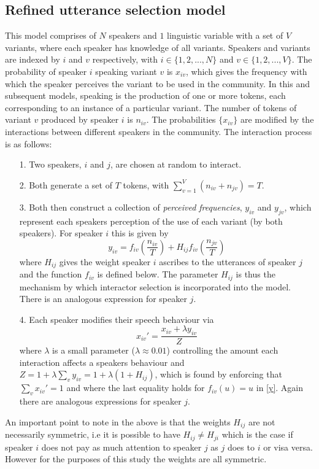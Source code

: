 \documentclass[12pt]{article}
\begin{document}
\subsection{Refined utterance selection model}
This model comprises of $N$ speakers and $1$ linguistic variable with a set of $V$ variants, where each speaker has knowledge of all variants. Speakers and variants are indexed by $i$ and $v$ respectively, with $i \in \{1, 2, ... , N\}$ and $v \in \{1, 2, ..., V\}$. The probability of speaker $i$ speaking variant $v$ is $x_{iv}$, which gives the frequency with which the speaker perceives the variant to be used in the community. In this and subsequent models, speaking is the production of one or more tokens, each corresponding to an instance of a particular variant. The number of tokens of variant $v$ produced by speaker $i$ is $n_{iv}$. The probabilities $\{x_{iv}\}$ are modified by the interactions between different speakers in the community. The interaction process is as follows: 
\begin{itemize}
\item[1.] Two speakers, $i$ and $j$, are chosen at random to interact.
\item[2.] Both generate a set of $T$ tokens, with $\sum\limits_{v = 1}^{V} (n_{iv} + n_{jv}) = T$. 
\item[3.] Both then construct a collection of \emph{perceived frequencies}, $y_{iv}$ and $y_{jv}$, which represent each speakers perception of the use of each variant (by both speakers). For speaker $i$ this is given by
\begin{equation} \label{y}
y_{iv} = f_{iv}(\frac{n_{iv}}{T}) + H_{ij}f_{iv}(\frac{n_{jv}}{T})
\end{equation}
where $H_{ij}$ gives the weight speaker $i$ ascribes to the utterances of speaker $j$ and the function $f_{iv}$ is defined below. The parameter $H_{ij}$ is thus the mechanism by which interactor selection is incorporated into the model. There is an analogous expression for speaker $j$. 
\item[4.] Each speaker modifies their speech behaviour via
\begin{equation}\label{x}
x_{iv}' = \frac{x_{iv} + \lambda y_{iv}}{Z}
\end{equation}
where $\lambda$ is a small parameter ($\lambda \approx 0.01$) controlling the amount each interaction affects a speakers behaviour and $Z = 1 + \lambda \sum\limits_{v} y_{iv} = 1 + \lambda (1 + H_{ij})$, which is found by enforcing that $\sum\limits_{v} x_{iv}' = 1$ and where the last equality holds for $f_{iv}(u) = u$ in \eqref{y}. Again there are analogous expressions for speaker $j$.
\end{itemize}
An important point to note in the above is that the weights $H_{ij}$ are not necessarily symmetric, i.e it is possible to have $H_{ij} \neq  H_{ji}$ which is the case if speaker $i$ does not pay as much attention to speaker $j$ as $j$ does to $i$ or visa versa. However for the purposes of this study the weights are all symmetric. 
\end{document}
